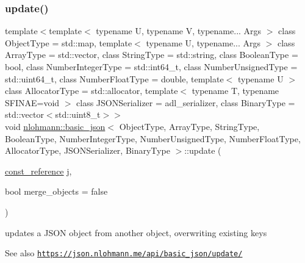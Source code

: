 \subsubsection{\texorpdfstring{update()}{update()}\hspace{0.1cm}{\footnotesize\ttfamily [1/2]}}
{\footnotesize\ttfamily template$<$template$<$ typename U, typename V, typename... Args $>$ class Object\+Type = std\+::map, template$<$ typename U, typename... Args $>$ class Array\+Type = std\+::vector, class String\+Type  = std\+::string, class Boolean\+Type  = bool, class Number\+Integer\+Type  = std\+::int64\+\_\+t, class Number\+Unsigned\+Type  = std\+::uint64\+\_\+t, class Number\+Float\+Type  = double, template$<$ typename U $>$ class Allocator\+Type = std\+::allocator, template$<$ typename T, typename S\+F\+I\+N\+A\+E=void $>$ class J\+S\+O\+N\+Serializer = adl\+\_\+serializer, class Binary\+Type  = std\+::vector$<$std\+::uint8\+\_\+t$>$$>$ \\
void \hyperlink{classnlohmann_1_1basic__json}{nlohmann\+::basic\+\_\+json}$<$ Object\+Type, Array\+Type, String\+Type, Boolean\+Type, Number\+Integer\+Type, Number\+Unsigned\+Type, Number\+Float\+Type, Allocator\+Type, J\+S\+O\+N\+Serializer, Binary\+Type $>$\+::update (\begin{DoxyParamCaption}\item[{\hyperlink{classnlohmann_1_1basic__json_ab8a1c33ee7b154fc41ca2545aa9724e6}{const\+\_\+reference}}]{j,  }\item[{bool}]{merge\+\_\+objects = {\ttfamily false} }\end{DoxyParamCaption})\hspace{0.3cm}{\ttfamily [inline]}}



updates a J\+S\+ON object from another object, overwriting existing keys 

\begin{DoxySeeAlso}{See also}
\href{https://json.nlohmann.me/api/basic_json/update/}{\tt https\+://json.\+nlohmann.\+me/api/basic\+\_\+json/update/} 
\end{DoxySeeAlso}
\mbox{\label{classnlohmann_1_1basic__json_a4fd9b1d17f9636dec1a33344a09d2651}} 
